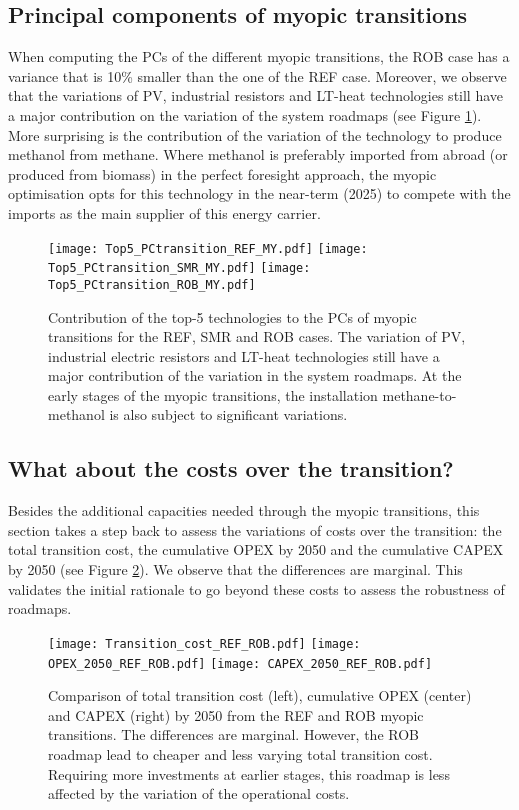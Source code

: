 \subsection{Principal components of myopic transitions}
\label{subsec:RobPol:PC_MY_transition}
When computing the \gls{PCs} of the different myopic transitions, the ROB case has a variance that is 10\% smaller than the one of the REF case. Moreover, we observe that the variations of \gls{PV}, industrial resistors and \gls{LT}-heat technologies still have a major contribution on the variation of the system roadmaps (see Figure \ref{fig:Top5_PCtransition_cases}). More surprising is the contribution of the variation of the technology to produce methanol from methane. Where methanol is preferably imported from abroad (or produced from biomass) in the perfect foresight approach, the myopic optimisation opts for this technology in the near-term (2025) to compete with the imports as the main supplier of this energy carrier.

\begin{figure}[!htbp]
\centering
\texttt{[image: Top5\_PCtransition\_REF\_MY.pdf]}
\texttt{[image: Top5\_PCtransition\_SMR\_MY.pdf]}
\texttt{[image: Top5\_PCtransition\_ROB\_MY.pdf]}
\caption{Contribution of the top-5 technologies to the \gls{PCs} of myopic transitions for the REF, SMR and ROB cases. The variation of \gls{PV}, industrial electric resistors and \gls{LT}-heat technologies still have a major contribution of the variation in the system roadmaps. At the early stages of the myopic transitions, the installation methane-to-methanol is also subject to significant variations.}
\label{fig:Top5_PCtransition_cases}
\end{figure}

\subsection{What about the costs over the transition?}
\label{subsec:RobPol:costs_comparison}
Besides the additional capacities needed through the myopic transitions, this section takes a step back to assess the variations of costs over the transition: the total transition cost, the cumulative \gls{OPEX} by 2050 and the cumulative \gls{CAPEX} by 2050 (see Figure \ref{fig:Total_Opex_Capex_REF_ROB}). We observe that the differences are marginal. This validates the initial rationale to go beyond these costs to assess the robustness of roadmaps.

\begin{figure}[!htbp]
\centering
\texttt{[image: Transition\_cost\_REF\_ROB.pdf]}
\texttt{[image: OPEX\_2050\_REF\_ROB.pdf]}
\texttt{[image: CAPEX\_2050\_REF\_ROB.pdf]}
\caption{Comparison of total transition cost (left), cumulative OPEX (center) and CAPEX (right) by 2050 from the REF and ROB myopic transitions. The differences are marginal. However, the ROB roadmap lead to cheaper and less varying total transition cost. Requiring more investments at earlier stages, this roadmap is less affected by the variation of the operational costs.}
\label{fig:Total_Opex_Capex_REF_ROB}
\end{figure}

